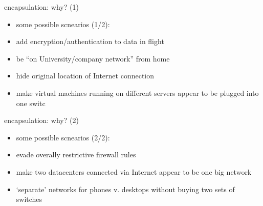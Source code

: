 \begin{frame}{encapsulation: why? (1)}
    \begin{itemize}
    \item some possible scnearios (1/2):
    \vspace{.5cm}
    \item add encryption/authentication to data in flight
    \item be ``on University/company network'' from home
    \item hide original location of Internet connection
    \item make virtual machines running on different servers appear to be plugged into one switc
    \end{itemize}
\end{frame}

\begin{frame}{encapsulation: why? (2)}
    \begin{itemize}
    \item some possible scnearios (2/2):
    \vspace{.5cm}
    \item evade overally restrictive firewall rules
    \item make two datacenters connected via Internet appear to be one big network
    \item `separate' networks for phones v. desktops without buying two sets of switches
    \end{itemize}
\end{frame}

